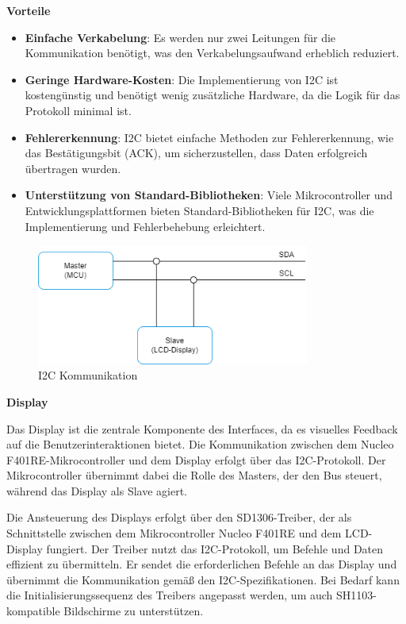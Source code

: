 \textbf{Vorteile}

\begin{itemize}
	\item \textbf{Einfache Verkabelung}: Es werden nur zwei Leitungen für die Kommunikation benötigt, was den Verkabelungsaufwand erheblich reduziert.
	\item \textbf{Geringe Hardware-Kosten}: Die Implementierung von I2C ist kostengünstig und benötigt wenig zusätzliche Hardware, da die Logik für das Protokoll minimal ist.
	\item \textbf{Fehlererkennung}: I2C bietet einfache Methoden zur Fehlererkennung, wie das Bestätigungsbit (ACK), um sicherzustellen, dass Daten erfolgreich übertragen wurden.
	\item \textbf{Unterstützung von Standard-Bibliotheken}: Viele Mikrocontroller und Entwicklungsplattformen bieten Standard-Bibliotheken für I2C, was die Implementierung und Fehlerbehebung erleichtert.
\end{itemize}

\begin{figure}[H]
	\centering
	\includegraphics[width=0.8\textwidth]{images/08_durchfuehrung/interface/I2C.drawio.png}
	\caption{I2C Kommunikation}
	\label{fig:I2C}
\end{figure}

\newpage	
\textbf{Display}	


Das Display ist die zentrale Komponente des Interfaces, da es visuelles Feedback auf die Benutzerinteraktionen bietet. Die Kommunikation zwischen dem Nucleo F401RE-Mikrocontroller und dem Display erfolgt über das I2C-Protokoll. Der Mikrocontroller übernimmt dabei die Rolle des Masters, der den Bus steuert, während das Display als Slave agiert.

Die Ansteuerung des Displays erfolgt über den SD1306-Treiber, der als Schnittstelle zwischen dem Mikrocontroller Nucleo F401RE und dem LCD-Display fungiert. Der Treiber nutzt das I2C-Protokoll, um Befehle und Daten effizient zu übermitteln. Er sendet die erforderlichen Befehle an das Display und übernimmt die Kommunikation gemäß den I2C-Spezifikationen. Bei Bedarf kann die Initialisierungssequenz des Treibers angepasst werden, um auch SH1103-kompatible Bildschirme zu unterstützen.

